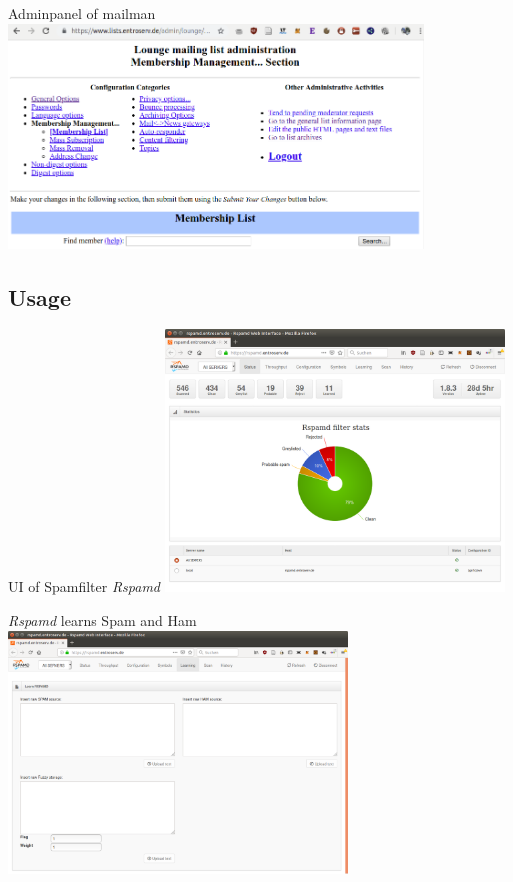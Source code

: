 \documentclass{beamer}
\begin{document}
\begin{frame}[fragile]{\insertsection}{\insertsubsection}
	\vspace{-0.5cm}
	Adminpanel of mailman
	\includegraphics[width=11cm]{mailmanadmin.png}\\

\end{frame}	

\subsection{Usage}
\begin{frame}[fragile]{\insertsection}{\insertsubsection}
	UI of Spamfilter \emph{Rspamd}
	\includegraphics[width=9cm]{rspamdgui.png}\\
\end{frame}	

\begin{frame}[fragile]{\insertsection}{\insertsubsection}
	\emph{Rspamd} learns Spam and Ham
	\includegraphics[width=9cm]{rspamdguilearn.png}\\
\end{frame}	
\end{document}
